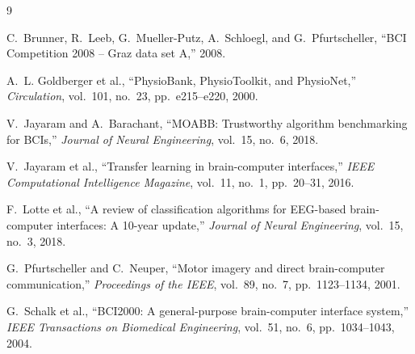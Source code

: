 \documentclass[10pt,twocolumn]{article}
\begin{document}
\begin{thebibliography}{9}

C.~Brunner, R.~Leeb, G.~Mueller-Putz, A.~Schloegl, and G.~Pfurtscheller,
``BCI Competition 2008 -- Graz data set A,'' 2008.

A.~L. Goldberger et al.,
``PhysioBank, PhysioToolkit, and PhysioNet,''
\emph{Circulation}, vol.~101, no.~23, pp.~e215--e220, 2000.

V.~Jayaram and A.~Barachant,
``MOABB: Trustworthy algorithm benchmarking for BCIs,''
\emph{Journal of Neural Engineering}, vol.~15, no.~6, 2018.

V.~Jayaram et al.,
``Transfer learning in brain-computer interfaces,''
\emph{IEEE Computational Intelligence Magazine},
vol.~11, no.~1, pp.~20--31, 2016.

F.~Lotte et al.,
``A review of classification algorithms for EEG-based brain-computer
interfaces: A 10-year update,''
\emph{Journal of Neural Engineering}, vol.~15, no.~3, 2018.

G.~Pfurtscheller and C.~Neuper,
``Motor imagery and direct brain-computer communication,''
\emph{Proceedings of the IEEE},
vol.~89, no.~7, pp.~1123--1134, 2001.

G.~Schalk et al.,
``BCI2000: A general-purpose brain-computer interface system,''
\emph{IEEE Transactions on Biomedical Engineering},
vol.~51, no.~6, pp.~1034--1043, 2004.

\end{thebibliography}
\end{document}
